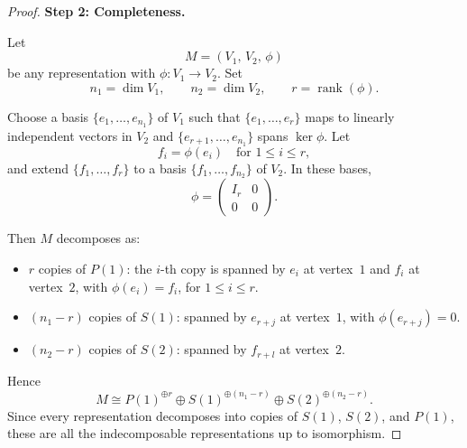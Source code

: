 \documentclass[11pt, a4paper]{article}
\begin{document}
\begin{enumerate}[leftmargin=*, label=\textbf{\arabic*.}]
\begin{proof}
\medskip\noindent\textbf{Step 2: Completeness.}

Let
\[
M = (V_1,\,V_2,\,\phi)
\]
be any representation with $\phi\colon V_1\to V_2$. Set
\[
n_1 = \dim V_1,\qquad n_2 = \dim V_2,\qquad r = \operatorname{rank}(\phi).
\]

Choose a basis $\{e_1,\ldots,e_{n_1}\}$ of $V_1$ such that $\{e_1,\ldots,e_r\}$ maps to linearly independent vectors in $V_2$ and $\{e_{r+1},\ldots,e_{n_1}\}$ spans $\ker\phi$. Let
\[
f_i = \phi(e_i) \quad\text{for } 1\leq i\leq r,
\]
and extend $\{f_1,\ldots,f_r\}$ to a basis $\{f_1,\ldots,f_{n_2}\}$ of $V_2$. In these bases,
\[
\phi = \begin{pmatrix} I_r & 0 \\ 0 & 0 \end{pmatrix}.
\]

Then $M$ decomposes as:
\begin{itemize}
\item $r$ copies of $P(1)$: the $i$-th copy is spanned by $e_i$ at vertex~$1$ and $f_i$ at vertex~$2$, with $\phi(e_i)=f_i$, for $1\leq i\leq r$.
\item $(n_1-r)$ copies of $S(1)$: spanned by $e_{r+j}$ at vertex~$1$, with $\phi(e_{r+j})=0$.
\item $(n_2-r)$ copies of $S(2)$: spanned by $f_{r+l}$ at vertex~$2$.
\end{itemize}

Hence
\[
M \cong P(1)^{\oplus r} \oplus S(1)^{\oplus(n_1-r)} \oplus S(2)^{\oplus(n_2-r)}.
\]
Since every representation decomposes into copies of $S(1)$, $S(2)$, and $P(1)$, these are all the indecomposable representations up to isomorphism.
\end{proof}


\end{enumerate}
\end{document}

